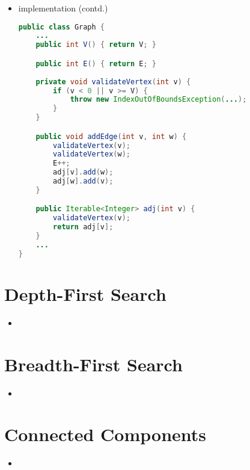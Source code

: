 \documentclass[8pt,a4paper,compress]{beamer}
\begin{document}
\begin{frame}[fragile]
\begin{itemize}
\item implementation (contd.)
\begin{lstlisting}[language=Java]
public class Graph {
    ...
    public int V() { return V; }

    public int E() { return E; }
 
    private void validateVertex(int v) {
        if (v < 0 || v >= V) {
            throw new IndexOutOfBoundsException(...);
        }
    }

    public void addEdge(int v, int w) {
        validateVertex(v);
        validateVertex(w);
        E++;
        adj[v].add(w);
        adj[w].add(v);
    }

    public Iterable<Integer> adj(int v) {
        validateVertex(v);
        return adj[v];
    }
    ...
}
\end{lstlisting}
\end{itemize}
\end{frame}

\section{Depth-First Search}
\begin{frame}[fragile]
\begin{itemize}
\item 
\end{itemize}
\end{frame}

\section{Breadth-First Search}
\begin{frame}[fragile]
\begin{itemize}
\item 
\end{itemize}
\end{frame}

\section{Connected Components}
\begin{frame}[fragile]
\begin{itemize}
\item 
\end{itemize}
\end{frame}
\end{document}
